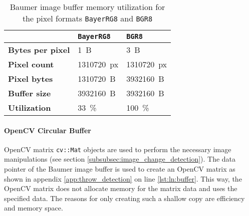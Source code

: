 
\begin{table}[h]
  \caption{Baumer image buffer memory utilization for the pixel formats \texttt{BayerRG8} and \texttt{BGR8}}
  \label{tab:buffer_memory_utilization}
  \centering
  \begin{tabular}{lll}
    \toprule
     & \textbf{\texttt{BayerRG8}} & \textbf{\texttt{BGR8}} \\
    \midrule
    \textbf{Bytes per pixel} & \SI{1}{B} & \SI{3}{B} \\
    \textbf{Pixel count} & \SI{1310720}{px} & \SI{1310720}{px} \\
    \textbf{Pixel bytes} & \SI{1310720}{B} & \SI{3932160}{B} \\
    \textbf{Buffer size} & \SI{3932160}{B} & \SI{3932160}{B} \\
    \textbf{Utilization} & \SI{33}{\percent} & \SI{100}{\percent} \\
    \bottomrule
  \end{tabular}
\end{table}



\paragraph{OpenCV Circular Buffer}

OpenCV matrix \texttt{cv::Mat} objects are used to perform the necessary image manipulations (see section \ref{subsubsec:image_change_detection}).
The data pointer of the Baumer image buffer is used to create an OpenCV matrix as shown in appendix \ref{app:throw_detection} on line \ref{lst:ln:buffer}.
This way, the OpenCV matrix does not allocate memory for the matrix data and uses the specified data.
The reasons for only creating such a shallow copy are efficiency and memory space.

